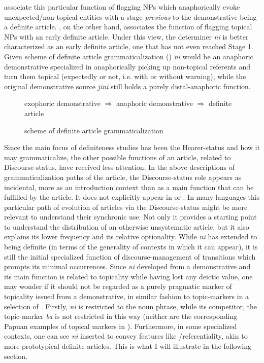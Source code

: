 \documentclass[output=paper
,modfonts
,nonflat]{langsci/langscibook}
\begin{document}
\citet{HeineKuteva2006} associate this particular function of flagging NPs which anaphorically evoke unexpected/non-topical entities with a stage \textit{previous} to the demonstrative being a definite article. \citet{Givon2001}, on the other hand, associates the function of flagging topical NPs with an early definite article. Under this view, the determiner \textit{ni} is better characterized as an early definite article, one that has not even reached  Stage 1. 
Given  scheme of definite article grammaticalization () \textit{ni} would be an anaphoric demonstrative specialized in anaphorically picking up non-topical referents and turn them topical (expectedly or not, i.e. with or without warning), while the original demonstrative source \textit{jini} still holds a purely distal-anaphoric function.

\begin{figure}[h] 
	\centering
	\caption{ scheme of definite article grammaticalization}
	exophoric demonstrative $\Rightarrow$ anaphoric demonstrative $\Rightarrow$ definite article \label{fig:pico:5}
\end{figure}

Since the main focus of definiteness studies has been the Hearer-status and how it may grammaticalize, the other possible functions of an article, related to Discourse-status, have received less attention.  
In the above descriptions of grammaticalization paths of the article, the Discourse-status role appears as incidental, more as an introduction context than as a main function that can be fulfilled by the article. It does not explicitly appear in  or . In many languages this particular path of evolution of articles via the Discourse-status might be more relevant to understand their synchronic use. Not only it provides a starting point to understand the distribution of an otherwise unsystematic article, but it also explains its lower frequency and its relative optionality. 
While \textit{ni} has extended to being definite (in terms of the generality of contexts in which it can appear), it is still the initial specialized function of discourse-management of transitions which prompts its minimal occurrences. 
Since \textit{ni} developed from a demonstrative and its main function is related to topicality while having lost any deictic value, one may wonder if it should not be regarded as a purely pragmatic marker of topicality issued from a demonstrative, in similar fashion to topic-markers in a selection of  \citep{deVries1995}. 
Firstly, \textit{ni} is restricted to the noun phrase, while its competitor, the topic-marker \textit{ba} is not restricted in this way (neither are the corresponding Papuan examples of topical markers in \citealt{deVries1995}). Furthermore, in some specialized contexts, one can see \textit{ni} inserted to convey features like /referentiality, akin to more prototypical definite articles. This is what I will illustrate in the following section.
\end{document}
